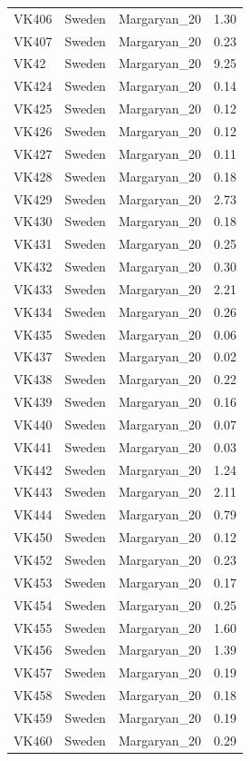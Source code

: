 \begin{longtable}[t]{lllr}
VK406 & Sweden & Margaryan\_20 & 1.30\\
VK407 & Sweden & Margaryan\_20 & 0.23\\
VK42 & Sweden & Margaryan\_20 & 9.25\\
VK424 & Sweden & Margaryan\_20 & 0.14\\
VK425 & Sweden & Margaryan\_20 & 0.12\\
VK426 & Sweden & Margaryan\_20 & 0.12\\
VK427 & Sweden & Margaryan\_20 & 0.11\\
VK428 & Sweden & Margaryan\_20 & 0.18\\
VK429 & Sweden & Margaryan\_20 & 2.73\\
VK430 & Sweden & Margaryan\_20 & 0.18\\
VK431 & Sweden & Margaryan\_20 & 0.25\\
VK432 & Sweden & Margaryan\_20 & 0.30\\
VK433 & Sweden & Margaryan\_20 & 2.21\\
VK434 & Sweden & Margaryan\_20 & 0.26\\
VK435 & Sweden & Margaryan\_20 & 0.06\\
VK437 & Sweden & Margaryan\_20 & 0.02\\
VK438 & Sweden & Margaryan\_20 & 0.22\\
VK439 & Sweden & Margaryan\_20 & 0.16\\
VK440 & Sweden & Margaryan\_20 & 0.07\\
VK441 & Sweden & Margaryan\_20 & 0.03\\
VK442 & Sweden & Margaryan\_20 & 1.24\\
VK443 & Sweden & Margaryan\_20 & 2.11\\
VK444 & Sweden & Margaryan\_20 & 0.79\\
VK450 & Sweden & Margaryan\_20 & 0.12\\
VK452 & Sweden & Margaryan\_20 & 0.23\\
VK453 & Sweden & Margaryan\_20 & 0.17\\
VK454 & Sweden & Margaryan\_20 & 0.25\\
VK455 & Sweden & Margaryan\_20 & 1.60\\
VK456 & Sweden & Margaryan\_20 & 1.39\\
VK457 & Sweden & Margaryan\_20 & 0.19\\
VK458 & Sweden & Margaryan\_20 & 0.18\\
VK459 & Sweden & Margaryan\_20 & 0.19\\
VK460 & Sweden & Margaryan\_20 & 0.29\\

\end{longtable}
